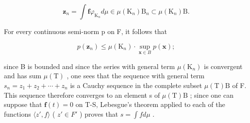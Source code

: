 \[
\mathbf {z} _ {n} = \int \mathbf {f} \varphi_ {\mathrm{K} _ {n}} d \mu \in \mu (\mathrm{K} _ {n}) \mathrm{B} _ {n} \subset \mu (\mathrm{K} _ {n}) \mathrm{B}.
\]

For every continuous semi-norm p on F, it follows that

\[
p (\mathbf {z} _ {n}) \leqslant \mu (\mathrm{K} _ {n}) \cdot \sup _ {\mathbf {x} \in B} p (\mathbf {x});
\]

since B is bounded and since the series with general term \(\mu(\mathrm{K}_{n})\) is convergent and has sum \(\mu(\mathrm{T})\) , one sees that the sequence with general term \(s_{n}=z_{1}+z_{2}+\cdots+z_{n}\) is a Cauchy sequence in the complete subset \(\mu(\mathrm{T})\mathrm{B}\) of F. This sequence therefore converges to an element s of \(\mu(\mathrm{T})\mathrm{B}\) ; since one can suppose that \(\mathbf{f}(t)=0\) on T-S, Lebesgue's theorem applied to each of the functions \(\langle z', f\rangle\) ( \(z'\in F'\) ) proves that \(s=\int f d\mu\) .
